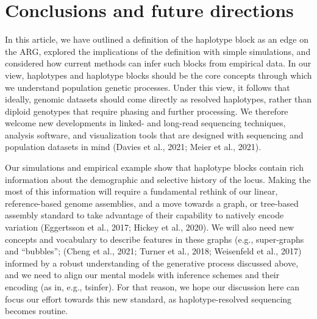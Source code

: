 \documentclass[twocolumn]{bmcart}%
\begin{document}
\section*{Conclusions and future directions}
In this article, we have outlined a definition of the haplotype block as an edge on the ARG, explored the implications of the definition with simple simulations, and considered how current methods can infer such blocks from empirical data. In our view, haplotypes and haplotype blocks should be the core concepts through which we understand population genetic processes. Under this view, it follows that ideally, genomic datasets should come directly as resolved haplotypes, rather than diploid genotypes that require phasing and further processing. We therefore welcome new developments in linked- and long-read sequencing techniques, analysis software, and visualization tools that are designed with sequencing and population datasets in mind (Davies et al., 2021; Meier et al., 2021).

Our simulations and empirical example show that haplotype blocks contain rich information about the demographic and selective history of the locus. Making the most of this information will require a fundamental rethink of our linear, reference-based genome assemblies, and a move towards a graph, or tree-based assembly standard to take advantage of their capability to natively encode variation (Eggertsson et al., 2017; Hickey et al., 2020). We will also need new concepts and vocabulary to describe features in these graphs (e.g., super-graphs and “bubbles”; (Cheng et al., 2021; Turner et al., 2018; Weisenfeld et al., 2017) informed by a robust understanding of the generative process discussed above, and we need to align our mental models with inference schemes and their encoding (as in, e.g., tsinfer). For that reason, we hope our discussion here can focus our effort towards this new standard, as haplotype-resolved sequencing becomes routine.

\phantom{\cite{}}



\end{document}

